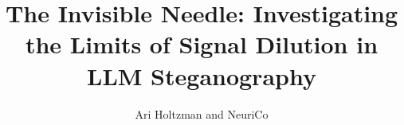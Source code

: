 \documentclass{article}
\title{The Invisible Needle: Investigating the Limits of Signal Dilution in LLM Steganography}
\author{Ari Holtzman and NeuriCo}
\begin{document}
\maketitle

\begin{abstract}

\end{abstract}










\end{document}
